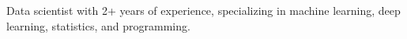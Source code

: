 



\begin{cvparagraph}

Data scientist with 2+ years of experience, specializing in machine learning, deep learning, statistics, and programming.
\end{cvparagraph}

